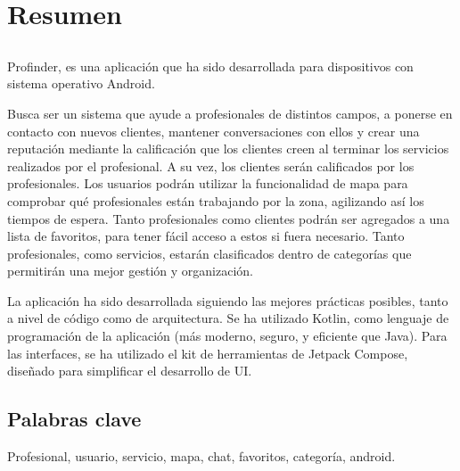 \chapter*{Resumen}

\section*{\tituloPortadaVal}

Profinder, es una aplicación que ha sido desarrollada para dispositivos con sistema operativo Android. 

Busca ser un sistema que ayude a profesionales de distintos campos, a ponerse en contacto con nuevos clientes, mantener conversaciones con ellos y crear una reputación mediante la calificación que los clientes creen al terminar los servicios realizados por el profesional. A su vez, los clientes serán calificados por los profesionales. Los usuarios podrán utilizar la funcionalidad de mapa para comprobar qué profesionales están trabajando por la zona, agilizando así los tiempos de espera. Tanto profesionales como clientes podrán ser agregados a una lista de favoritos, para tener fácil acceso a estos si fuera necesario. Tanto profesionales, como servicios, estarán clasificados dentro de categorías que permitirán una mejor gestión y organización.

La aplicación ha sido desarrollada siguiendo las mejores prácticas posibles, tanto a nivel de código como de arquitectura. Se ha utilizado Kotlin, como lenguaje de programación de la aplicación (más moderno, seguro, y eficiente que Java). Para las interfaces, se ha utilizado el kit de herramientas de Jetpack Compose, diseñado para simplificar el desarrollo de UI.

\section*{Palabras clave}
   
\noindent Profesional, usuario, servicio, mapa, chat, favoritos, categoría, android.

   


